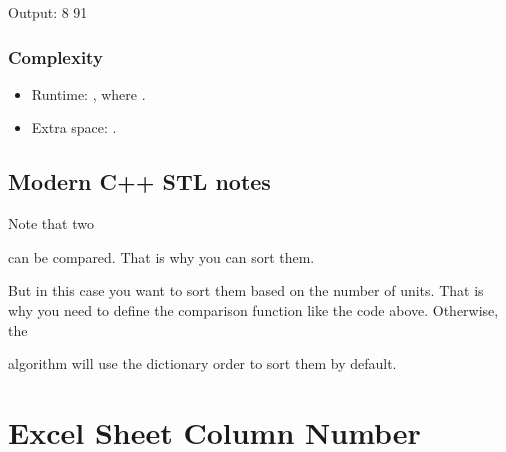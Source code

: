 \documentclass[letterpaper,12pt,english]{book}
\begin{document}
\begin{sphinxVerbatim}[commandchars=\\\{\}]
Output:
8
91
\end{sphinxVerbatim}


\subsubsection{Complexity}
\label{\detokenize{Mathematics/09_MTH_1710_Maximum_Units_on_a_Truck:complexity}}\begin{itemize}
\item {} 
\sphinxAtStartPar
Runtime: , where .

\item {} 
\sphinxAtStartPar
Extra space: .

\end{itemize}


\subsection{Modern C++ STL notes}
\label{\detokenize{Mathematics/09_MTH_1710_Maximum_Units_on_a_Truck:modern-c-stl-notes}}
\sphinxAtStartPar
Note that two %
\begin{footnote}[117]\sphinxAtStartFootnote
{}
%
\end{footnote} can be compared. That is why you can sort them.

\sphinxAtStartPar
But in this case you want to sort them based on the number of units. That is why you need to define the comparison function like the code above. Otherwise, the %
\begin{footnote}[118]\sphinxAtStartFootnote
{}
%
\end{footnote} algorithm will use the dictionary order to sort them by default.

\sphinxstepscope


\section{Excel Sheet Column Number}
\label{\detokenize{Mathematics/09_MTH_171_Excel_Sheet_Collumn_Number:excel-sheet-column-number}}\label{\detokenize{Mathematics/09_MTH_171_Excel_Sheet_Collumn_Number::doc}}
\end{document}
